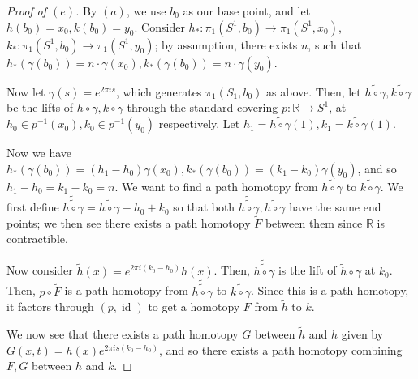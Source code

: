 \documentclass[12pt]{article}
\theoremstyle{remark}
\DeclareMathOperator{\id}{id}
\begin{document}
\begin{proof}[Proof of $(e)$]
  By $(a)$, we use $b_0$ as our base point, and let $h(b_0) = x_0, k(b_0) =
  y_0$. Consider $h_*\colon \pi_1(S^1,b_0) \to \pi_1(S^1,x_0)$, $k_*\colon \pi_1(S^1,b_0) \to \pi_1(S^1,y_0)$; by assumption, there exists $n$, such that $h_*(\gamma(b_0)) = n \cdot \gamma(x_0), k_*(\gamma(b_0)) = n \cdot \gamma(y_0)$.
  \par Now let $\gamma(s) = e^{2\pi is}$, which generates $\pi_1(S_1,b_0)$ as
  above. Then, let $\widetilde{h \circ \gamma},\widetilde{k \circ \gamma}$ be
  the lifts of $h \circ \gamma, k \circ \gamma$ through the standard covering
  $p\colon \mathbb{R} \to S^1$, at $h_0 \in p^{-1}(x_0),k_0 \in p^{-1}(y_0)$ respectively. Let $h_1 = \widetilde{h \circ \gamma}(1), k_1 = \widetilde{k \circ \gamma}(1)$.
  \par Now we have $h_*(\gamma(b_0)) = (h_1-h_0) \gamma(x_0), k_*(\gamma(b_0)) = (k_1-k_0) \gamma(y_0)$, and so $h_1-h_0 = k_1-k_0 = n$. We want to find a path homotopy from $\widetilde{h \circ \gamma}$ to $\widetilde{k \circ \gamma}$. We first define $\widetilde{\widetilde{h \circ \gamma}} = \widetilde{h \circ \gamma} - h_0 + k_0$ so that both $\widetilde{\widetilde{h \circ \gamma}}, \widetilde{h \circ \gamma}$ have the same end points; we then see there exists a path homotopy $\tilde{F}$ between them since $\mathbb{R}$ is contractible.
  \par Now consider $\tilde{h}(x) = e^{2\pi i(k_0-h_0)}h(x)$. Then, $\widetilde{\widetilde{h \circ \gamma}}$ is the lift of $\tilde{h} \circ \gamma$ at $k_0$. Then, $p \circ \tilde{F}$ is a path homotopy from $\widetilde{\widetilde{h \circ \gamma}}$ to $\widetilde{k \circ \gamma}$. Since this is a path homotopy, it factors through $(p,\id)$ to get a homotopy $F$ from $\tilde{h}$ to $k$.
  \par We now see that there exists a path homotopy $G$ between $\tilde{h}$ and $h$ given by $G(x,t) = h(x)e^{2\pi is(k_0-h_0)}$, and so there exists a path homotopy combining $F,G$ between $h$ and $k$.
\end{proof}
\end{document}
